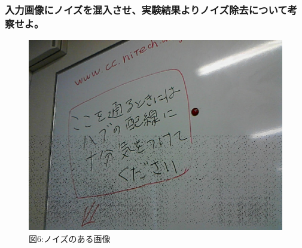 ﻿\documentclass[a4j,11pt]{jarticle}
\begin{document}
\subsubsection{入力画像にノイズを混入させ、実験結果よりノイズ除去について考察せよ。}
\clearpage
\begin{figure}[tb]

 \center
 \includegraphics[width=0.8\hsize]{./eps/noiz.eps}
 \\図6:ノイズのある画像
 \label{fig:affine1}


\end{figure}
\end{document}
